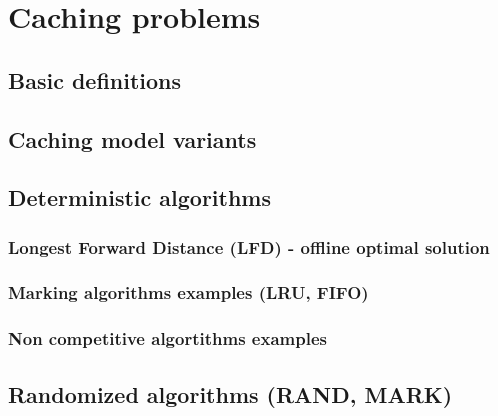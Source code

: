 \section{Caching problems}

\subsection{Basic definitions}

\subsection{Caching model variants}

\subsection{Deterministic algorithms}
\subsubsection{Longest Forward Distance (LFD) - offline optimal solution}
\subsubsection{Marking algorithms examples (LRU, FIFO)}
\subsubsection{Non competitive algortithms examples}

\subsection{Randomized algorithms (RAND, MARK)}